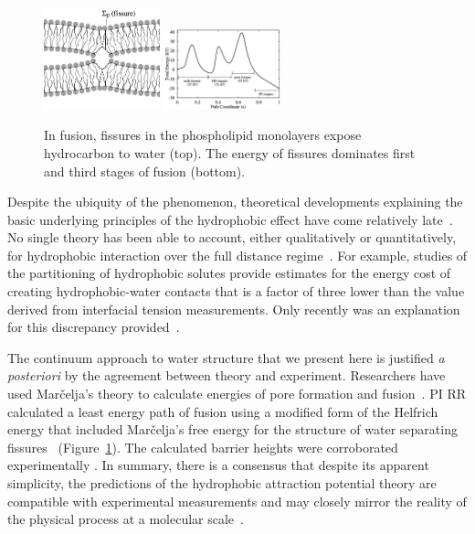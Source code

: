 \begin{figure}
  \vspace{-5pt}
\includegraphics[width=0.3\textwidth]{figures/Background/Fissure.jpg}
\includegraphics[width=0.3\textwidth]{figures/Background/Landscape.jpg}
\caption{\label{fig:fissure} In fusion, fissures in the phospholipid
  monolayers expose hydrocarbon to water (top). The energy of fissures
  dominates first and third stages of fusion (bottom).
}
\end{figure}
Despite the ubiquity of
the phenomenon, theoretical developments explaining the basic underlying
principles of the hydrophobic effect have come relatively
late~\cite{Ch05}.
No single theory has been able to account, either qualitatively
or quantitatively,
for hydrophobic interaction over the full distance
regime~\cite{Lum1999, Lin2005, Meyer2006, Ducker2016}.
For example, studies of the partitioning of
hydrophobic solutes provide estimates for the energy cost of creating
hydrophobic-water contacts
that is a factor of three lower than the value derived from interfacial
tension measurements. Only recently was an explanation for this
discrepancy provided~\cite{Jackson2016}.

The continuum approach to water structure
that we present here is justified
\textit{a posteriori} by the agreement between theory and experiment.
Researchers have used Mar\v{c}elja's theory to calculate
energies of pore formation and fusion~\cite{Gletal88, Aketal17,
RyKlYaCo16}.
PI RR calculated a least energy path 
of fusion using a modified form of the Helfrich energy that
included Mar\v{c}elja's free energy for the structure of water
separating fissures~\cite{RyKlYaCo16} (Figure~\ref{fig:fissure}).
The calculated barrier heights were 
corroborated experimentally \cite{FrRoPi17}. In summary,
there is a consensus that despite its apparent simplicity, the predictions
of the hydrophobic attraction potential theory are compatible with
experimental measurements and may closely mirror the reality of
the physical process at a molecular scale~\cite{FrRoPi17, Fretal21}.

